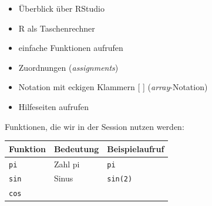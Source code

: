 \documentclass[]{book}
\providecommand{\tightlist}{%
  \setlength{\itemsep}{0pt}\setlength{\parskip}{0pt}}
\begin{document}
\begin{itemize}
\tightlist
\item
  Überblick über RStudio
\item
  R als Taschenrechner
\item
  einfache Funktionen aufrufen
\item
  Zuordnungen (\emph{assignments})
\item
  Notation mit eckigen Klammern {[} {]} (\emph{array}-Notation)
\item
  Hilfeseiten aufrufen
\end{itemize}

Funktionen, die wir in der Session nutzen werden:

\begin{longtable}[]{@{}lll@{}}
\toprule
\begin{minipage}[b]{0.30\columnwidth}\raggedright
Funktion\strut
\end{minipage} & \begin{minipage}[b]{0.28\columnwidth}\raggedright
Bedeutung\strut
\end{minipage} & \begin{minipage}[b]{0.33\columnwidth}\raggedright
Beispielaufruf\strut
\end{minipage}\tabularnewline
\midrule
\endhead
\begin{minipage}[t]{0.30\columnwidth}\raggedright
\texttt{pi}\strut
\end{minipage} & \begin{minipage}[t]{0.28\columnwidth}\raggedright
Zahl pi\strut
\end{minipage} & \begin{minipage}[t]{0.33\columnwidth}\raggedright
\texttt{pi}\strut
\end{minipage}\tabularnewline
\begin{minipage}[t]{0.30\columnwidth}\raggedright
\texttt{sin}\strut
\end{minipage} & \begin{minipage}[t]{0.28\columnwidth}\raggedright
Sinus\strut
\end{minipage} & \begin{minipage}[t]{0.33\columnwidth}\raggedright
\texttt{sin(2)}\strut
\end{minipage}\tabularnewline
\begin{minipage}[t]{0.30\columnwidth}\raggedright
\texttt{cos}\strut
\end{minipage} & \begin{minipage}[t]{0.28\columnwidth}\raggedright

\end{minipage}
\end{longtable}
\end{document}
